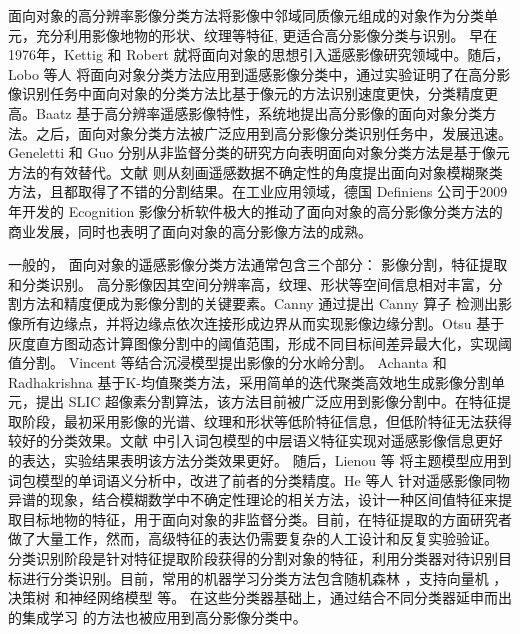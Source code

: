 面向对象的高分辨率影像分类方法将影像中邻域同质像元组成的对象作为分类单元，充分利用影像地物的形状、纹理等特征, 更适合高分影像分类与识别\cite{zhangyongsheng2004}。 早在1976年，Kettig 和 Robert \cite{kettig1976classification} 就将面向对象的思想引入遥感影像研究领域中。随后，Lobo 等人 \cite{lobo1996classification} 将面向对象分类方法应用到遥感影像分类中，通过实验证明了在高分影像识别任务中面向对象的分类方法比基于像元的方法识别速度更快，分类精度更高。Baatz \cite{baatz1999object} 基于高分辨率遥感影像特性，系统地提出高分影像的面向对象分类方法。之后，面向对象分类方法被广泛应用到高分影像分类识别任务中，发展迅速。 Geneletti \cite{geneletti2003method} 和 Guo \cite{guo2007object} 分别从非监督分类的研究方向表明面向对象分类方法是基于像元方法的有效替代。文献\citep{yu2012method, he2016remote} 则从刻画遥感数据不确定性的角度提出面向对象模糊聚类方法，且都取得了不错的分割结果。在工业应用领域，德国 Definiens 公司于2009 年开发的 Ecognition 影像分析软件极大的推动了面向对象的高分影像分类方法的商业发展，同时也表明了面向对象的高分影像方法的成熟。

一般的， 面向对象的遥感影像分类方法通常包含三个部分： 影像分割，特征提取和分类识别。 高分影像因其空间分辨率高，纹理、形状等空间信息相对丰富，分割方法和精度便成为影像分割的关键要素。Canny 通过提出 Canny 算子 \cite{canny1987computational} 检测出影像所有边缘点，并将边缘点依次连接形成边界从而实现影像边缘分割。Otsu 基于灰度直方图动态计算图像分割中的阈值范围，形成不同目标间差异最大化，实现阈值分割\cite{otsu1979threshold}。 Vincent \cite{vincent1991watersheds} 等结合沉浸模型提出影像的分水岭分割。 Achanta 和 Radhakrishna \cite{achanta2012slic} 基于K-均值聚类方法，采用简单的迭代聚类高效地生成影像分割单元，提出 SLIC 超像素分割算法，该方法目前被广泛应用到影像分割中。在特征提取阶段，最初采用影像的光谱、纹理和形状等低阶特征信息，但低阶特征无法获得较好的分类效果。文献 \cite{weizman2009urban} 中引入词包模型的中层语义特征实现对遥感影像信息更好的表达，实验结果表明该方法分类效果更好。 随后，Lienou 等\cite{lienou2010semantic} 将主题模型应用到词包模型的单词语义分析中，改进了前者的分类精度。He 等人 \cite{he2016remote} 针对遥感影像同物异谱的现象，结合模糊数学中不确定性理论的相关方法，设计一种区间值特征来提取目标地物的特征，用于面向对象的非监督分类。目前，在特征提取的方面研究者做了大量工作，然而，高级特征的表达仍需要复杂的人工设计和反复实验验证。 分类识别阶段是针对特征提取阶段获得的分割对象的特征，利用分类器对待识别目标进行分类识别。目前，常用的机器学习分类方法包含随机森林 \cite{pal2005random}，支持向量机 \cite{suykens1999least} ，决策树 \cite{friedl1997decision} 和神经网络模型 \cite{haykin1994neural} 等。 在这些分类器基础上，通过结合不同分类器延申而出的集成学习 \cite{freund1996experiments} 的方法也被应用到高分影像分类中。


